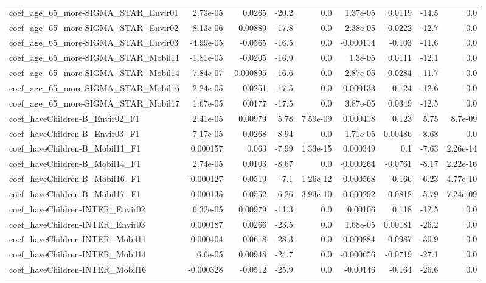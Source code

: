 \begin{tabular}{lrrrrrrrr}
coef_age_65_more-SIGMA_STAR_Envir01 & 2.73e-05 & 0.0265 & -20.2 & 0.0 & 1.37e-05 & 0.0119 & -14.5 & 0.0 \\
coef_age_65_more-SIGMA_STAR_Envir02 & 8.13e-06 & 0.00889 & -17.8 & 0.0 & 2.38e-05 & 0.0222 & -12.7 & 0.0 \\
coef_age_65_more-SIGMA_STAR_Envir03 & -4.99e-05 & -0.0565 & -16.5 & 0.0 & -0.000114 & -0.103 & -11.6 & 0.0 \\
coef_age_65_more-SIGMA_STAR_Mobil11 & -1.81e-05 & -0.0205 & -16.9 & 0.0 & 1.3e-05 & 0.0111 & -12.1 & 0.0 \\
coef_age_65_more-SIGMA_STAR_Mobil14 & -7.84e-07 & -0.000895 & -16.6 & 0.0 & -2.87e-05 & -0.0284 & -11.7 & 0.0 \\
coef_age_65_more-SIGMA_STAR_Mobil16 & 2.24e-05 & 0.0251 & -17.5 & 0.0 & 0.000133 & 0.124 & -12.6 & 0.0 \\
coef_age_65_more-SIGMA_STAR_Mobil17 & 1.67e-05 & 0.0177 & -17.5 & 0.0 & 3.87e-05 & 0.0349 & -12.5 & 0.0 \\
coef_haveChildren-B_Envir02_F1 & 2.41e-05 & 0.00979 & 5.78 & 7.59e-09 & 0.000418 & 0.123 & 5.75 & 8.7e-09 \\
coef_haveChildren-B_Envir03_F1 & 7.17e-05 & 0.0268 & -8.94 & 0.0 & 1.71e-05 & 0.00486 & -8.68 & 0.0 \\
coef_haveChildren-B_Mobil11_F1 & 0.000157 & 0.063 & -7.99 & 1.33e-15 & 0.000349 & 0.1 & -7.63 & 2.26e-14 \\
coef_haveChildren-B_Mobil14_F1 & 2.74e-05 & 0.0103 & -8.67 & 0.0 & -0.000264 & -0.0761 & -8.17 & 2.22e-16 \\
coef_haveChildren-B_Mobil16_F1 & -0.000127 & -0.0519 & -7.1 & 1.26e-12 & -0.000568 & -0.166 & -6.23 & 4.77e-10 \\
coef_haveChildren-B_Mobil17_F1 & 0.000135 & 0.0552 & -6.26 & 3.93e-10 & 0.000292 & 0.0818 & -5.79 & 7.24e-09 \\
coef_haveChildren-INTER_Envir02 & 6.32e-05 & 0.00979 & -11.3 & 0.0 & 0.00106 & 0.118 & -12.5 & 0.0 \\
coef_haveChildren-INTER_Envir03 & 0.000187 & 0.0266 & -23.5 & 0.0 & 1.68e-05 & 0.00181 & -26.2 & 0.0 \\
coef_haveChildren-INTER_Mobil11 & 0.000404 & 0.0618 & -28.3 & 0.0 & 0.000884 & 0.0987 & -30.9 & 0.0 \\
coef_haveChildren-INTER_Mobil14 & 6.6e-05 & 0.00948 & -24.7 & 0.0 & -0.000656 & -0.0719 & -27.1 & 0.0 \\
coef_haveChildren-INTER_Mobil16 & -0.000328 & -0.0512 & -25.9 & 0.0 & -0.00146 & -0.164 & -26.6 & 0.0 \\

\end{tabular}

